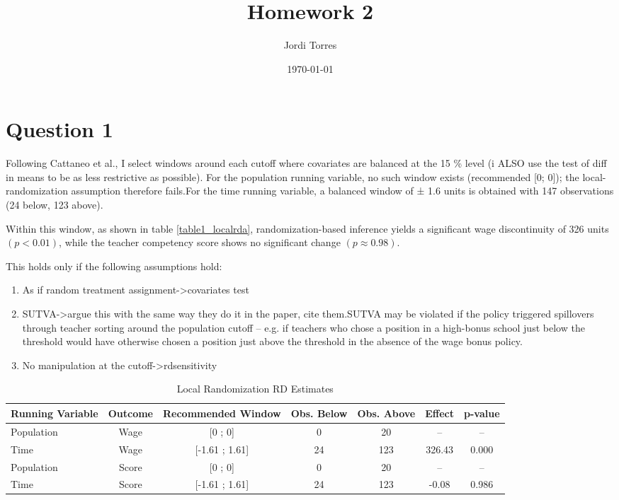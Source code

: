 \documentclass{article}
\begin{document}
\title{Homework 2}
\author{Jordi Torres}
\date{\today}


\maketitle




\section{Question 1}

Following Cattaneo et al., I select windows around each cutoff where covariates are balanced at the 15 \% level (i ALSO use the test of diff in means to be as less restrictive as possible). For the population running variable, no such window exists (recommended [0; 0]); the local-randomization assumption therefore fails.For the time running variable, a balanced window of ± 1.6 units is obtained with 147 observations (24 below, 123 above).

Within this window, as shown in table \ref{table1_localrda}, randomization-based inference yields a significant wage discontinuity of 326 units $(p < 0.01)$, while the teacher competency score shows no significant change $(p \approx 0.98)$.

This holds only if the following assumptions hold:

\begin{enumerate}
    \item As if random treatment assignment->covariates test
    \item SUTVA->argue this with the same way they do it in the paper, cite them.SUTVA may be violated if the policy triggered spillovers through teacher sorting around  the population cutoff – e.g. if teachers who chose a position in a high-bonus school just  below the threshold would have otherwise chosen a position just above the threshold in  the absence of the wage bonus policy.
    \item No manipulation at the cutoff->rdsensitivity
\end{enumerate}


\begin{table}[H]
\centering
\caption{Local Randomization RD Estimates}
\begin{tabular}{lcccccc}
\toprule
\textbf{Running Variable} & \textbf{Outcome} & \textbf{Recommended Window} & \textbf{Obs. Below} & \textbf{Obs. Above} & \textbf{Effect} & \textbf{p-value} \\
\midrule
Population & Wage  & [0 ; 0]             & 0   & 20  & --      & --     \\
Time       & Wage  & [-1.61 ; 1.61]      & 24  & 123 & 326.43  & 0.000  \\
Population & Score & [0 ; 0]             & 0   & 20  & --      & --     \\
Time       & Score & [-1.61 ; 1.61]      & 24  & 123 & -0.08   & 0.986  \\
\bottomrule
\end{tabular}
\label{table1_localrd}
\end{table}
\end{document}
